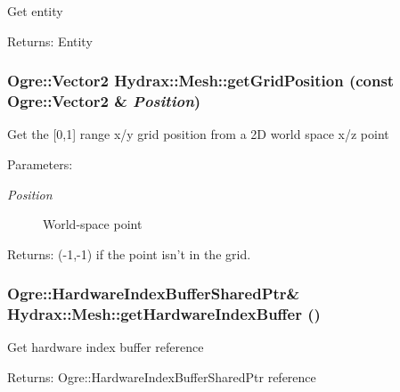\begin{CompactItemize}
Get entity \begin{Desc}
\item[Returns:]Entity \end{Desc}
\hypertarget{class_hydrax_1_1_mesh_12f5fa6397bc9cb5501d0e246b8a952c}{
\subsubsection[{getGridPosition}]{\setlength{\rightskip}{0pt plus 5cm}Ogre::Vector2 Hydrax::Mesh::getGridPosition (const Ogre::Vector2 \& {\em Position})}}
\label{class_hydrax_1_1_mesh_12f5fa6397bc9cb5501d0e246b8a952c}


Get the \mbox{[}0,1\mbox{]} range x/y grid position from a 2D world space x/z point \begin{Desc}
\item[Parameters:]
\begin{description}
\item[{\em Position}]World-space point \end{description}
\end{Desc}
\begin{Desc}
\item[Returns:](-1,-1) if the point isn't in the grid. \end{Desc}
\hypertarget{class_hydrax_1_1_mesh_b7eee5c0eafda96c493533ae26e73c65}{
\subsubsection[{getHardwareIndexBuffer}]{\setlength{\rightskip}{0pt plus 5cm}Ogre::HardwareIndexBufferSharedPtr\& Hydrax::Mesh::getHardwareIndexBuffer ()}}
\label{class_hydrax_1_1_mesh_b7eee5c0eafda96c493533ae26e73c65}


Get hardware index buffer reference \begin{Desc}
\item[Returns:]Ogre::HardwareIndexBufferSharedPtr reference \end{Desc}
\hypertarget{class_hydrax_1_1_mesh_429bf7b9c15604e6a2e3a988b2473484}{
}
\end{CompactItemize}

